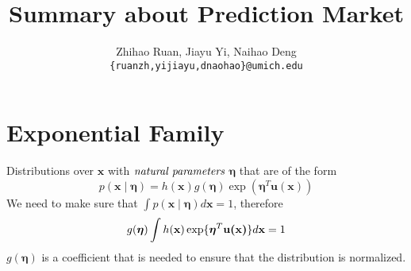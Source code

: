 \documentclass[12pt]{article}
\title{\textbf{Summary about Prediction Market}}
\author{Zhihao Ruan, Jiayu Yi, Naihao Deng\\\texttt{\{ruanzh,yijiayu,dnaohao\}@umich.edu}}
\begin{document}
\maketitle
\tableofcontents


\newpage
\section{Exponential Family}
Distributions over $\textbf{x}$ with $\emph{natural parameters}$ $\bm{\eta}$ that are of the form
\begin{equation}\label{eq:expo_fam}
p(\textbf{x}\mid\bm{\eta})=h(\mathbf{x})g(\bm{\eta})\exp(\bm{\eta}^T\textbf{u}(\textbf{x}))
\end{equation}
We need to make sure that
$\int{p(\textbf{x}\mid\bm{\eta})}d\bm{x}=1$, therefore 
\begin{equation}\label{eq:normalize}
g(\bm{\eta})\int{h(\textbf{x})\exp\{\bm{\eta}^T\textbf{u(\textbf{x})}\}}d\textbf{x}=1
\end{equation}
$g(\bm{\eta})$ is a coefficient that is needed to ensure that the distribution is normalized.
\end{document}
